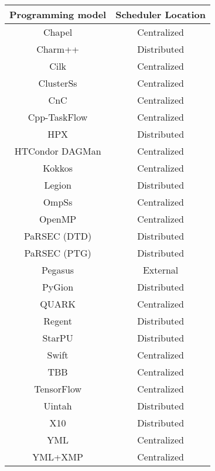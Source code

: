 \begin{tabular}{cc}
\hline
Programming model & Scheduler Location \\
\hline
Chapel & Centralized\\
Charm++ & Distributed\\
Cilk & Centralized\\
ClusterSs & Centralized\\
CnC & Centralized\\
Cpp-TaskFlow & Centralized\\
HPX & Distributed\\
HTCondor DAGMan & Centralized\\
Kokkos & Centralized\\
Legion & Distributed\\
OmpSs & Centralized\\
OpenMP & Centralized\\
PaRSEC (DTD) & Distributed\\
PaRSEC (PTG) & Distributed\\
Pegasus & External\\
PyGion & Distributed\\
QUARK & Centralized\\
Regent & Distributed\\
StarPU & Distributed\\
Swift & Centralized\\
TBB & Centralized\\
TensorFlow & Centralized\\
Uintah & Distributed\\
X10 & Distributed\\
YML & Centralized\\
YML+XMP & Centralized\\
\hline
\end{tabular}
